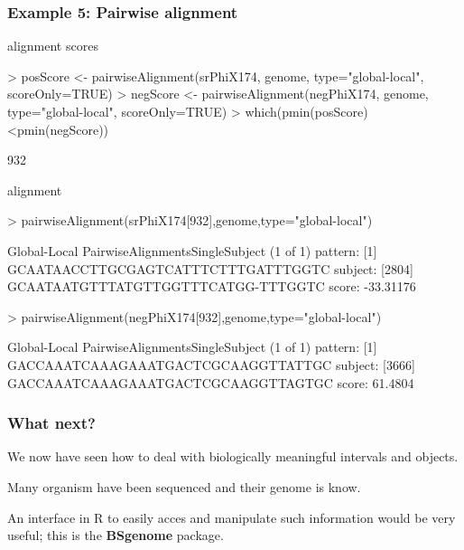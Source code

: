 \documentclass{beamer}
\begin{document}

\begin{frame}[fragile]
\frametitle{Example 5: Pairwise alignment}
  \bit
      \item alignment scores
           \begin{uncoverenv}
\begin{Schunk}
\begin{Sinput}
> posScore <- pairwiseAlignment(srPhiX174, genome, type="global-local", scoreOnly=TRUE)
> negScore <- pairwiseAlignment(negPhiX174, genome, type="global-local", scoreOnly=TRUE)
> which(pmin(posScore)<pmin(negScore))
\end{Sinput}
\begin{Soutput}
[1] 932
\end{Soutput}
\end{Schunk}
          \end{uncoverenv}
      \item alignment
        \begin{uncoverenv}
\begin{Schunk}
\begin{Sinput}
> pairwiseAlignment(srPhiX174[932],genome,type="global-local")
\end{Sinput}
\begin{Soutput}
Global-Local PairwiseAlignmentsSingleSubject (1 of 1)
pattern:    [1] GCAATAACCTTGCGAGTCATTTCTTTGATTTGGTC 
subject: [2804] GCAATAATGTTTATGTTGGTTTCATGG-TTTGGTC 
score: -33.31176 
\end{Soutput}
\begin{Sinput}
> pairwiseAlignment(negPhiX174[932],genome,type="global-local")
\end{Sinput}
\begin{Soutput}
Global-Local PairwiseAlignmentsSingleSubject (1 of 1)
pattern:    [1] GACCAAATCAAAGAAATGACTCGCAAGGTTATTGC 
subject: [3666] GACCAAATCAAAGAAATGACTCGCAAGGTTAGTGC 
score: 61.4804 
\end{Soutput}
\end{Schunk}
        \end{uncoverenv}
  \eit
\end{frame}


\begin{frame}
\frametitle{What next?}
  \bit
      \item We now have seen how to deal with biologically meaningful intervals and objects.
      \item Many organism have been sequenced and their genome is know.
      \item An interface in R to easily acces and manipulate such information would be very useful; this is the \textbf{BSgenome} package.
  \eit
\end{frame}
\end{document}
